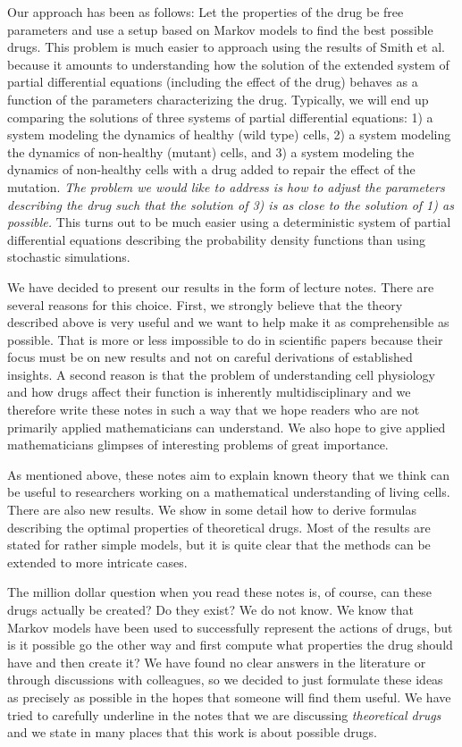 \bigskip

Our approach has been as follows: Let the properties of the drug be free parameters and use a setup based on Markov models to find the best possible drugs. This problem is much easier to approach using the results of Smith et al. because it amounts to understanding how the solution of the extended system of partial differential equations (including the effect of the drug)  behaves as a function of the parameters characterizing the drug. Typically, we will end up comparing the solutions of three systems of partial differential equations: 1) a system modeling the dynamics of healthy (wild type) cells, 2) a system modeling the dynamics of non-healthy (mutant) cells, and 3) a system modeling the dynamics of non-healthy cells with a drug added to repair the effect of the mutation. {\it The problem we would like to address is how to adjust the parameters describing the drug such that the solution of 3) is as close to the solution of 1) as possible.} This turns out to be much easier using a deterministic system of partial differential equations describing the probability density functions than using stochastic simulations.

\bigskip

 We have decided to present our results in the form of lecture notes. There are several reasons for this choice. First, we strongly believe that the theory described above is very useful and we want to help make it as comprehensible as possible. That is more or less impossible to do in scientific papers because their focus must be on new results and not on careful derivations of established insights. A second reason is that the problem of understanding cell physiology and how drugs affect their function is inherently multidisciplinary and we therefore write these notes in such a way that we hope readers who are not primarily applied mathematicians can understand.  We also hope to give applied mathematicians glimpses of interesting problems of great importance.
\bigskip

As mentioned above, these notes aim to explain known theory that we think can be useful to researchers working on a mathematical understanding of living cells.  There are also new results. We show in some detail how to derive formulas describing the optimal properties of theoretical drugs. Most of the results are stated for rather simple models, but it is quite clear that the methods can be extended to more intricate cases.
\bigskip

The million dollar question when you read these notes is, of course, can these drugs actually be created? Do they exist? We do not know. We know that Markov models have been used to successfully represent the actions of drugs, but is it possible go the other way and first compute what properties the drug should have and then create it?  We have found no clear answers in the literature or through discussions with colleagues, so we decided to just formulate these ideas as precisely as possible in the hopes that someone will find them useful. We have tried to carefully underline in the notes that we are discussing {\it theoretical drugs} and we state in many places that this work is about possible drugs. 

